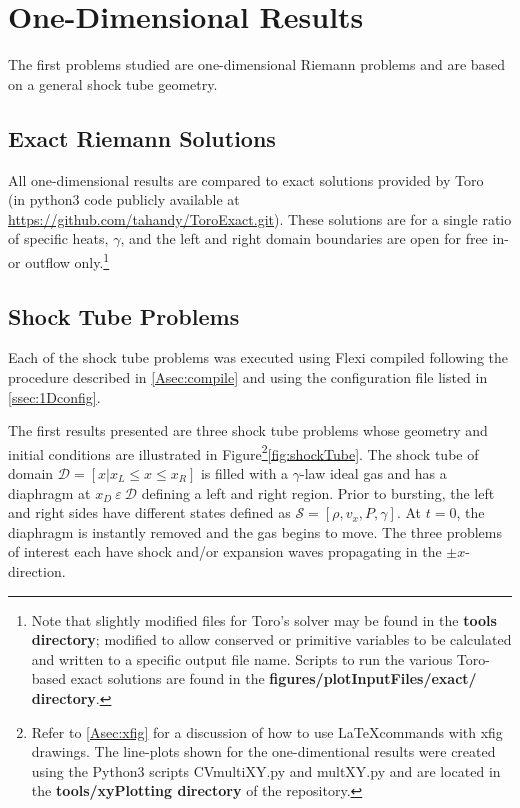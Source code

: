\documentclass[review]{elsarticle}
\begin{document}
\section{One-Dimensional Results}\label{sec:1D}

The first problems studied are one-dimensional Riemann problems and are based on a general shock tube geometry.

\subsection{Exact Riemann Solutions}

All one-dimensional results are compared to exact solutions provided by Toro~\cite{toro} (in python3 code publicly available at \url{https://github.com/tahandy/ToroExact.git}).  These solutions are for a single ratio of specific heats, $\gamma$, and the left and right domain boundaries are open for free in- or outflow only.\footnote{Note that slightly modified files for Toro's solver may be found in the \textbf{tools directory}; modified to allow conserved or primitive variables to be calculated and written to a specific output file name. Scripts to run the various Toro-based exact solutions are found in the \textbf{figures/plotInputFiles/exact/ directory}.}

\subsection{Shock Tube Problems}\label{sec:sockTubes}

Each of the shock tube problems was executed using Flexi compiled following the procedure described in \ref{Asec:compile} and using the configuration file listed in \ref{ssec:1Dconfig}.

The first results presented are three shock tube problems whose geometry and initial conditions are illustrated in Figure\footnote{Refer to \ref{Asec:xfig} for a discussion of how to use \LaTeX commands with xfig drawings. The line-plots shown for the one-dimentional results were created using the Python3 scripts CVmultiXY.py and multXY.py and are located in the \textbf{tools/xyPlotting directory} of the repository.}\ref{fig:shockTube}.  The shock tube of domain $\mathcal{D} = [x |  x_L \leq x \leq x_R]$  is filled with a $\gamma$-law ideal gas and has a diaphragm at $x_D \  \varepsilon \ \mathcal{D}$ defining a left and right region.  Prior to bursting, the left and right sides have different states defined as $\mathcal{S} = [\rho, v_x, P, \gamma]$.  At $t = 0$, the diaphragm is instantly removed and the gas begins to move.  The three problems of interest each have shock and/or expansion waves propagating in the $\pm x$-direction.
\end{document}
